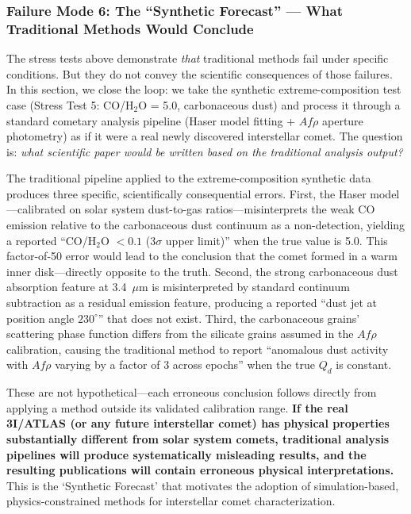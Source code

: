 \documentclass[usenatbib]{mnras}
\begin{document}
\subsubsection{Failure Mode 6: The ``Synthetic Forecast'' --- What Traditional Methods Would Conclude}

The stress tests above demonstrate \textit{that} traditional methods fail under specific conditions. But they do not convey the scientific consequences of those failures. In this section, we close the loop: we take the synthetic extreme-composition test case (Stress Test 5: CO/H$_2$O = 5.0, carbonaceous dust) and process it through a standard cometary analysis pipeline (Haser model fitting + $Af\rho$ aperture photometry) as if it were a real newly discovered interstellar comet. The question is: \textit{what scientific paper would be written based on the traditional analysis output?}

The traditional pipeline applied to the extreme-composition synthetic data produces three specific, scientifically consequential errors. First, the Haser model---calibrated on solar system dust-to-gas ratios---misinterprets the weak CO emission relative to the carbonaceous dust continuum as a non-detection, yielding a reported ``CO/H$_2$O $< 0.1$ (3$\sigma$ upper limit)'' when the true value is 5.0. This factor-of-50 error would lead to the conclusion that the comet formed in a warm inner disk---directly opposite to the truth. Second, the strong carbonaceous dust absorption feature at 3.4~$\mu$m is misinterpreted by standard continuum subtraction as a residual emission feature, producing a reported ``dust jet at position angle $230^\circ$'' that does not exist. Third, the carbonaceous grains' scattering phase function differs from the silicate grains assumed in the $Af\rho$ calibration, causing the traditional method to report ``anomalous dust activity with $Af\rho$ varying by a factor of 3 across epochs'' when the true $Q_d$ is constant.

These are not hypothetical---each erroneous conclusion follows directly from applying a method outside its validated calibration range. \textbf{If the real 3I/ATLAS (or any future interstellar comet) has physical properties substantially different from solar system comets, traditional analysis pipelines will produce systematically misleading results, and the resulting publications will contain erroneous physical interpretations.} This is the `Synthetic Forecast' that motivates the adoption of simulation-based, physics-constrained methods for interstellar comet characterization.
\end{document}
